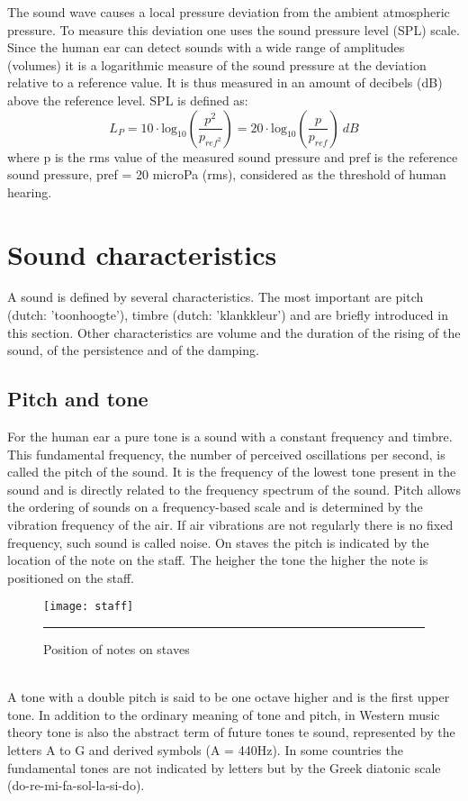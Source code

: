 The sound wave causes a local pressure deviation from the ambient atmospheric pressure. To measure this deviation one uses the sound pressure level (SPL) scale. Since the human ear can detect sounds with a wide range of amplitudes (volumes) it is a logarithmic measure of the sound pressure at the deviation relative to a reference value. It is thus measured in an amount of decibels (dB) above the reference level. SPL is defined as:
\begin{equation}
L_{P} = 10\cdot \mathrm{log}_{10} (\frac{p^{2}}{p_{ref^{2}}} ) = 20 \cdot \mathrm{log}_{10} (\frac{p}{p_{ref}}) \medspace dB
\end{equation}
where p is the rms value of the measured sound pressure and pref is the reference sound pressure, pref = 20 microPa (rms), considered as the threshold of human hearing.

\section{Sound characteristics}
A sound is defined by several characteristics. The most important are pitch (dutch: 'toonhoogte'), timbre (dutch: 'klankkleur') and are briefly introduced in this section. Other characteristics are volume and the duration of the rising of the sound, of the persistence and of the damping.

\subsection{Pitch and tone}
For the human ear a pure tone is a sound with a constant frequency and timbre. This fundamental frequency, the number of perceived oscillations per second, is called the pitch of the sound. It is the frequency of the lowest tone present in the sound and is directly related to the frequency spectrum of the sound. Pitch allows the ordering of sounds on a frequency-based scale and is determined by the vibration frequency of the air. If air vibrations are not regularly there is no fixed frequency, such sound is called noise. On staves the pitch is indicated by the location of the note on the staff. The heigher the tone the higher the note is positioned on the staff.
\begin{figure}[htbp]
\centering
\texttt{[image: staff]}
\rule{30em}{0.5pt}
\caption{Position of notes on staves}
\label{fig:staff}
\end{figure} \\
A tone with a double pitch is said to be one octave higher and is the first upper tone. In addition to the ordinary meaning of tone and pitch, in Western music theory tone is also the abstract term of future tones te sound, represented by the letters A to G and derived symbols (A = 440Hz). In some countries the fundamental tones are not indicated by letters but by the Greek diatonic scale (do-re-mi-fa-sol-la-si-do).

